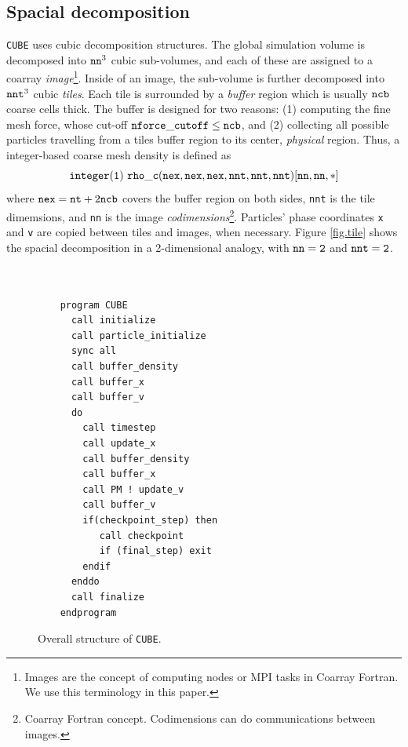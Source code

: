 \documentclass[10pt,twocolumn,preprint]{emulateapj}
\begin{document}
\subsection{Spacial decomposition}
{\tt CUBE} uses cubic decomposition structures. The global simulation volume is decomposed into ${\tt nn}^3$ cubic sub-volumes, and each of these are assigned to a coarray {\it image}\footnote{Images are the concept of computing nodes or MPI tasks in Coarray Fortran. We use this terminology in this paper.}. Inside of an image, the sub-volume is further decomposed into ${\tt nnt}^3$ cubic {\it tiles}. Each tile is surrounded by a {\it buffer} region which is usually ${\tt ncb}$ coarse cells thick. The buffer is designed for two reasons: (1) computing the fine mesh force, whose cut-off ${\tt nforce\_cutoff}\leq{\tt ncb}$, and (2) collecting all possible particles travelling from a tiles buffer region to its center, {\it physical} region. Thus, a integer-based coarse mesh density is defined as
\begin{equation*}
{\tt integer(1)\ rho\_c(nex,nex,nex,nnt,nnt,nnt)[nn,nn,*]}\\
\end{equation*}
where ${\tt nex}={\tt nt}+2{\tt ncb}$ covers the buffer region on both sides, {\tt nnt} is the tile dimemsions, and {\tt nn} is the image {\it codimensions}\footnote{Coarray Fortran concept. Codimensions can do communications between images.}. Particles' phase coordinates {\tt x} and {\tt v} are copied between tiles and images, when necessary. Figure \ref{fig.tile} shows the spacial decomposition in a 2-dimensional analogy, with ${\tt nn=2}$ and ${\tt nnt=2}$.

\begin{figure}[t]
\begin{verbatim}


    program CUBE
      call initialize
      call particle_initialize
      sync all
      call buffer_density
      call buffer_x
      call buffer_v
      do
        call timestep
        call update_x
        call buffer_density
        call buffer_x
        call PM ! update_v
        call buffer_v
        if(checkpoint_step) then
           call checkpoint
           if (final_step) exit
        endif
      enddo
      call finalize
    endprogram
\end{verbatim}
\caption{Overall structure of {\tt CUBE}.}
\label{fig.code}
\end{figure}
\end{document}
